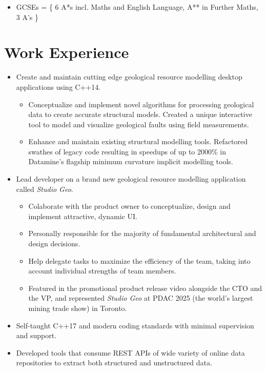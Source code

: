 \documentclass{my_cv}
\begin{document}
\begin{itemize}
	\color{MidnightBlue}
	\item GCSEs = \{ 6 A*s incl. Maths and English Language, A** in Further Maths, 3 A’s \}
\end{itemize}

\section{Work Experience}

\begin{itemize}
	\color{MidnightBlue}
	\item Create and maintain cutting edge geological resource modelling desktop applications using C++14.
	\begin{itemize}
		\item Conceptualize and implement novel algorithms for processing geological data to create accurate structural models. Created a unique interactive tool to model and visualize geological faults using field measurements.
		\item Enhance and maintain existing structural modelling tools. Refactored swathes of legacy code resulting in speedups of up to 2000\% in Datamine's flagship minimum curvature implicit modelling tools.
	\end{itemize}
	\item Lead developer on a brand new geological resource modelling application called \emph{Studio Geo}.
	\begin{itemize}
	    \item Colaborate with the product owner to conceptualize, design and implement attractive, dynamic UI.
	    \item Personally responsible for the majority of fundamental architectural and design decisions.
	    \item Help delegate tasks to maximize the efficiency of the team, taking into account individual strengths of team members.
	    \item Featured in the promotional product release video alongside the CTO and the VP, and represented \emph{Studio Geo} at PDAC 2025 (the world's largest mining trade show) in Toronto.
    \end{itemize}
\end{itemize}

\begin{itemize}
	\color{MidnightBlue}
	\item Self-taught C++17 and modern coding standards with minimal supervision and support.
	\item Developed tools that consume REST APIs of wide variety of online data repositories to extract both structured and unstructured data.
\end{itemize}
\end{document}
